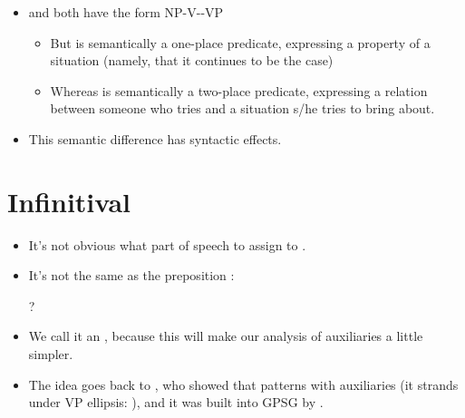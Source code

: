 \documentclass[a4paper,landscape,headrule,footrule]{foils}
\begin{document}

\begin{itemize}
\item  {} and 
both have the form NP-V--VP
  \begin{itemize}
  \item But  is semantically a one-place 
    predicate, expressing a property of a situation 
    (namely, that it continues to be the case)
    \\ 
  \item Whereas  is semantically a two-place 
    predicate, expressing a relation between someone 
    who tries and a situation s/he tries to bring about.
    \\ 
  \end{itemize}
\item This semantic difference has syntactic effects.
\end{itemize}

\section{Infinitival }



\begin{itemize}
\item It’s not obvious what part of speech to assign to .  
\item It’s not the same as the preposition :
  \begin{exe}
    \ex {}
    \ex {}
    \ex *?
    \ex {}
  \end{exe}
\item We call it an , because this will make 
our analysis of auxiliaries a little simpler.
\item The idea goes back to \citet{pullum:1982}, who showed that
   patterns with auxiliaries (it strands under VP ellipsis:
  ), and it was built into GPSG by
  \citet{gazdar-aux}.
\end{itemize}
\end{document}
